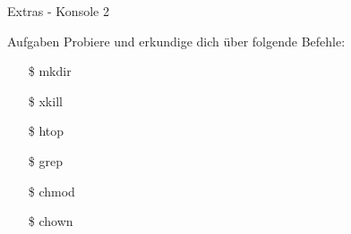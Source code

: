 \begin{frame}{Extras - Konsole 2}

    \begin{alertblock}{Aufgaben}
        Probiere und erkundige dich über folgende Befehle:
        \begin{enumerate}
            \item[\$] mkdir
            \item[\$] xkill
            \item[\$] htop
            \item[\$] grep
            \item[\$] chmod
            \item[\$] chown
        \end{enumerate}

    \end{alertblock}

\end{frame}
